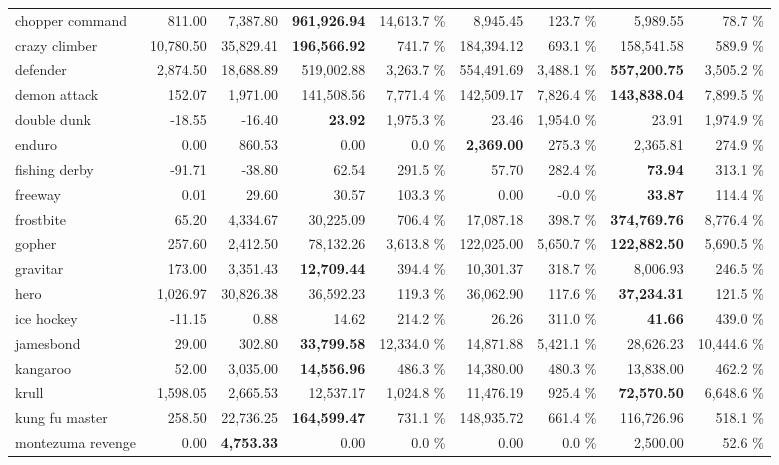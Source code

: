 \documentclass{article}
\begin{document}
\begin{table}
\begin{center}
\begin{tabularx}{\textwidth}{X| r r r r r r r r}
chopper command &811.00 & 7,387.80 & \textbf{961,926.94} & 14,613.7 \% & 8,945.45 & 123.7 \% & 5,989.55 & 78.7 \%\\
crazy climber &10,780.50 & 35,829.41 & \textbf{196,566.92} & 741.7 \% & 184,394.12 & 693.1 \% & 158,541.58 & 589.9 \%\\
defender &2,874.50 & 18,688.89 & 519,002.88 & 3,263.7 \% & 554,491.69 & 3,488.1 \% & \textbf{557,200.75} & 3,505.2 \%\\
demon attack &152.07 & 1,971.00 & 141,508.56 & 7,771.4 \% & 142,509.17 & 7,826.4 \% & \textbf{143,838.04} & 7,899.5 \%\\
double dunk &-18.55 & -16.40 & \textbf{23.92} & 1,975.3 \% & 23.46 & 1,954.0 \% & 23.91 & 1,974.9 \%\\
enduro &0.00 & 860.53 & 0.00 & 0.0 \% & \textbf{2,369.00} & 275.3 \% & 2,365.81 & 274.9 \%\\
fishing derby &-91.71 & -38.80 & 62.54 & 291.5 \% & 57.70 & 282.4 \% & \textbf{73.94} & 313.1 \%\\
freeway &0.01 & 29.60 & 30.57 & 103.3 \% & 0.00 & -0.0 \% & \textbf{33.87} & 114.4 \%\\
frostbite &65.20 & 4,334.67 & 30,225.09 & 706.4 \% & 17,087.18 & 398.7 \% & \textbf{374,769.76} & 8,776.4 \%\\
gopher &257.60 & 2,412.50 & 78,132.26 & 3,613.8 \% & 122,025.00 & 5,650.7 \% & \textbf{122,882.50} & 5,690.5 \%\\
gravitar &173.00 & 3,351.43 & \textbf{12,709.44} & 394.4 \% & 10,301.37 & 318.7 \% & 8,006.93 & 246.5 \%\\
hero &1,026.97 & 30,826.38 & 36,592.23 & 119.3 \% & 36,062.90 & 117.6 \% & \textbf{37,234.31} & 121.5 \%\\
ice hockey &-11.15 & 0.88 & 14.62 & 214.2 \% & 26.26 & 311.0 \% & \textbf{41.66} & 439.0 \%\\
jamesbond &29.00 & 302.80 & \textbf{33,799.58} & 12,334.0 \% & 14,871.88 & 5,421.1 \% & 28,626.23 & 10,444.6 \%\\
kangaroo &52.00 & 3,035.00 & \textbf{14,556.96} & 486.3 \% & 14,380.00 & 480.3 \% & 13,838.00 & 462.2 \%\\
krull &1,598.05 & 2,665.53 & 12,537.17 & 1,024.8 \% & 11,476.19 & 925.4 \% & \textbf{72,570.50} & 6,648.6 \%\\
kung fu master &258.50 & 22,736.25 & \textbf{164,599.47} & 731.1 \% & 148,935.72 & 661.4 \% & 116,726.96 & 518.1 \%\\
montezuma revenge &0.00 & \textbf{4,753.33} & 0.00 & 0.0 \% & 0.00 & 0.0 \% & 2,500.00 & 52.6 \%\\

\end{tabularx}
\end{center}
\end{table}
\end{document}
